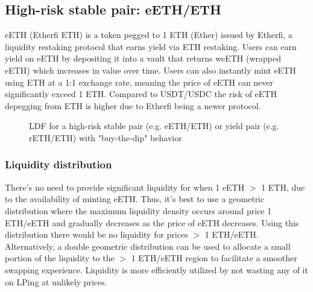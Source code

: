 \documentclass[twocolumn]{article}
\begin{document}
\subsection{High-risk stable pair: eETH/ETH}

eETH (Etherfi ETH)\cite{Etherfi} is a token pegged to 1 ETH (Ether) issued by Etherfi, a liquidity restaking protocol that earns yield via ETH restaking. Users can earn yield on eETH by depositing it into a vault that returns weETH (wrapped eETH) which increases in value over time. Users can also instantly mint eETH using ETH at a 1:1 exchange rate, meaning the price of eETH can never significantly exceed 1 ETH. Compared to USDT/USDC the risk of eETH depegging from ETH is higher due to Etherfi being a newer protocol.

\begin{figure}
  \centering
  \caption{LDF for a high-risk stable pair (e.g. eETH/ETH) or yield pair (e.g. rETH/ETH) with "buy-the-dip" behavior}
  \label{fig:high_risk_stable}
\end{figure}

\subsubsection{Liquidity distribution}

There's no need to provide significant liquidity for when 1 eETH $>$ 1 ETH, due to the availability of minting eETH. Thus, it's best to use a geometric distribution where the maximum liquidity density occurs around price 1 ETH/eETH and gradually decreases as the price of eETH decreases. Using this distribution there would be no liquidity for prices $>$ 1 ETH/eETH. Alternatively, a double geometric distribution can be used to allocate a small portion of the liquidity to the $>$ 1 ETH/eETH region to facilitate a smoother swapping experience. Liquidity is more efficiently utilized by not wasting any of it on LPing at unlikely prices.
\end{document}
